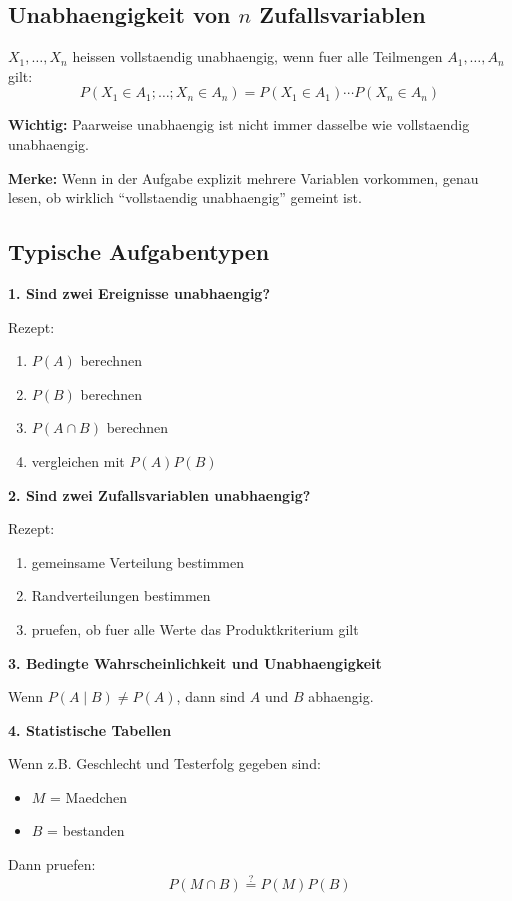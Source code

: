 \documentclass[a4paper,11pt]{article}
\begin{document}
\subsection{Unabhaengigkeit von $n$ Zufallsvariablen}
$X_1,\dots,X_n$ heissen vollstaendig unabhaengig, wenn fuer alle Teilmengen $A_1,\dots,A_n$ gilt:
\[
P(X_1\in A_1;\dots;X_n\in A_n)=P(X_1\in A_1)\cdots P(X_n\in A_n)
\]

\textbf{Wichtig:}
Paarweise unabhaengig ist nicht immer dasselbe wie vollstaendig unabhaengig.

\textbf{Merke:}
Wenn in der Aufgabe explizit mehrere Variablen vorkommen, genau lesen, ob wirklich ``vollstaendig unabhaengig'' gemeint ist.

\subsection{Typische Aufgabentypen}
\textbf{1. Sind zwei Ereignisse unabhaengig?}

Rezept:
\begin{enumerate}
  \item $P(A)$ berechnen
  \item $P(B)$ berechnen
  \item $P(A \cap B)$ berechnen
  \item vergleichen mit $P(A)P(B)$
\end{enumerate}

\textbf{2. Sind zwei Zufallsvariablen unabhaengig?}

Rezept:
\begin{enumerate}
  \item gemeinsame Verteilung bestimmen
  \item Randverteilungen bestimmen
  \item pruefen, ob fuer alle Werte das Produktkriterium gilt
\end{enumerate}

\textbf{3. Bedingte Wahrscheinlichkeit und Unabhaengigkeit}

Wenn $P(A\mid B)\neq P(A)$, dann sind $A$ und $B$ abhaengig.

\textbf{4. Statistische Tabellen}

Wenn z.B. Geschlecht und Testerfolg gegeben sind:
\begin{itemize}
  \item $M$ = Maedchen
  \item $B$ = bestanden
\end{itemize}

Dann pruefen:
\[
P(M \cap B)\stackrel{?}{=}P(M)P(B)
\]
\end{document}
